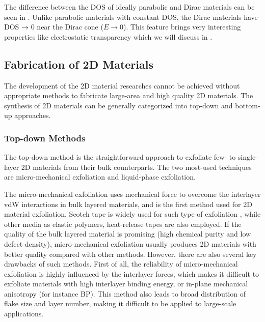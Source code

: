 The difference between the DOS of ideally parabolic and Dirac
materials can be seen in . Unlike parabolic
materials with constant DOS, the Dirac materials have DOS → 0 near the
Dirac cone ($E \to 0$). This feature brings very interesting
properties like electrostatic transparency which we will discuss in
.



\subsection{Fabrication of 2D Materials}
\label{sec:fabr-2d-mater}

The development of the 2D material researches cannot be achieved
without appropriate methods to fabricate large-area and high quality
2D materials. The synthesis of 2D materials can be generally
categorized into top-down and bottom-up approaches.

\subsubsection{Top-down Methods}
\label{sec:top-down-methods}

The top-down method is the straightforward approach to exfoliate few-
to single-layer 2D materials from their bulk counterparts. The two
most-used techniques are micro-mechanical exfoliation and liquid-phase
exfoliation. 

The micro-mechanical exfoliation uses mechanical force to overcome the
interlayer vdW interactions in bulk layered materials, and is the
first method used for 2D material exfoliation. Scotch tape is widely
used for such type of exfoliation , while
other media as elastic polymers, heat-release tapes are also
employed. If the quality of the bulk layered material is promising
(\ie high chemical purity and low defect density), micro-mechanical
exfoliation usually produces 2D materials with better quality compared
with other methods. However, there are also several key drawbacks of
such methods. First of all, the reliability of micro-mechanical
exfoliation is highly influenced by the interlayer forces, which makes
it difficult to exfoliate materials with high interlayer binding
energy, or in-plane mechanical anisotropy (for instance BP). This
method also leads to broad distribution of flake size and layer
number, making it difficult to be applied to large-scale
applications.

